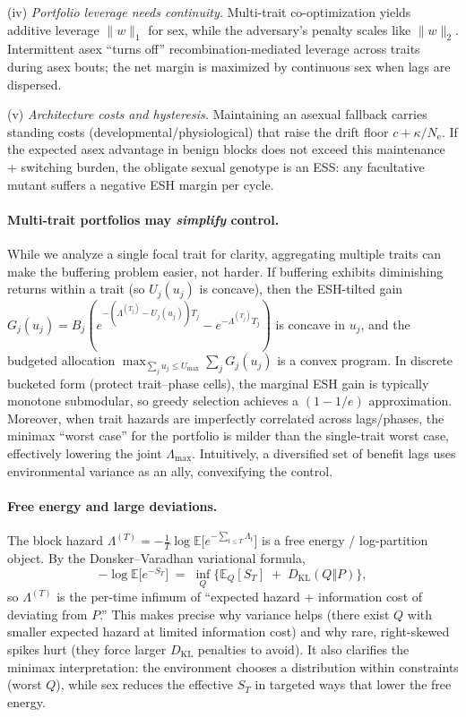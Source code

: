\documentclass[11pt]{article}
\theoremstyle{upright}
\newcommand{\E}{\mathbb{E}}
\newcommand{\Ne}{N_{\mathrm{e}}}
\newcommand{\hazT}[1]{\Lambda^{(#1)}}          %
\begin{document}
(iv) \emph{Portfolio leverage needs continuity.} Multi-trait co-optimization yields additive leverage $\|w\|_1$ for sex, while the adversary’s penalty scales like $\|w\|_2$. Intermittent asex “turns off” recombination-mediated leverage across traits during asex bouts; the net margin is maximized by continuous sex when lags are dispersed.

(v) \emph{Architecture costs and hysteresis.} Maintaining an asexual fallback carries standing costs (developmental/physiological) that raise the drift floor $c+\kappa/\Ne$. If the expected asex advantage in benign blocks does not exceed this maintenance + switching burden, the obligate sexual genotype is an ESS: any facultative mutant suffers a negative ESH margin per cycle.

\paragraph{Multi-trait portfolios may \emph{simplify} control.}
While we analyze a single focal trait for clarity, aggregating multiple traits can make the buffering problem easier, not harder. If buffering exhibits diminishing returns within a trait (so $U_j(u_j)$ is concave), then the ESH-tilted gain $G_j(u_j)=B_j\!\left(e^{-(\Lambda^{(T_j)}-U_j(u_j))T_j}-e^{-\Lambda^{(T_j)}T_j}\right)$ is concave in $u_j$, and the budgeted allocation $\max_{\sum_j u_j\le U_{\max}}\sum_j G_j(u_j)$ is a convex program. In discrete bucketed form (protect trait–phase cells), the marginal ESH gain is typically monotone submodular, so greedy selection achieves a $(1-1/e)$ approximation. Moreover, when trait hazards are imperfectly correlated across lags/phases, the minimax ``worst case'' for the portfolio is milder than the single-trait worst case, effectively lowering the joint $\Lambda_{\max}$. Intuitively, a diversified set of benefit lags uses environmental variance as an ally, convexifying the control.

\paragraph{Free energy and large deviations.}
The block hazard $\hazT{T}=-\tfrac1T\log \E\big[e^{-\sum_{t\le T}\Lambda_t}\big]$ is a free energy / log-partition
object. By the Donsker--Varadhan variational formula,
\[
-\log \E\big[e^{-S_T}\big] \;=\; \inf_{Q}\Big\{\E_Q[S_T] \;+\; D_{\mathrm{KL}}(Q\Vert P)\Big\},
\]
so $\hazT{T}$ is the per-time infimum of ``expected hazard + information cost of deviating from $P$.''
This makes precise why variance helps (there exist $Q$ with smaller expected hazard at limited information cost)
and why rare, right-skewed spikes hurt (they force larger $D_{\mathrm{KL}}$ penalties to avoid).
It also clarifies the minimax interpretation: the environment chooses a distribution within constraints (worst $Q$),
while sex reduces the effective $S_T$ in targeted ways that lower the free energy.
\end{document}
